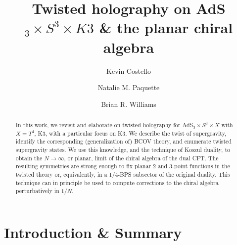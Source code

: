 \documentclass[11pt]{amsart}
\title{Twisted holography on AdS$_3 \times S^3 \times K3$ \& the planar chiral algebra}
\author{Kevin Costello}
\author{Natalie M. Paquette}
\author{Brian R. Williams}
\begin{document}
\maketitle

\begin{abstract} %
In this work, we revisit and elaborate on twisted holography for AdS$_3 \times S^3 \times X$ with $X= T^4$, K3, with a particular focus on K3. We describe the twist of supergravity, identify the corresponding (generalization of) BCOV theory, and enumerate twisted supergravity states. We use this knowledge, and the technique of Koszul duality, to obtain the $N \rightarrow \infty$, or planar, limit of the chiral algebra of the dual CFT. The resulting symmetries are strong enough to fix planar 2 and 3-point functions in the twisted theory or, equivalently, in a 1/4-BPS subsector of the original duality. This technique can in principle be used to compute corrections to the chiral algebra perturbatively in $1/N$.
\end{abstract}

\tableofcontents

\section{Introduction \& Summary}
\end{document}
